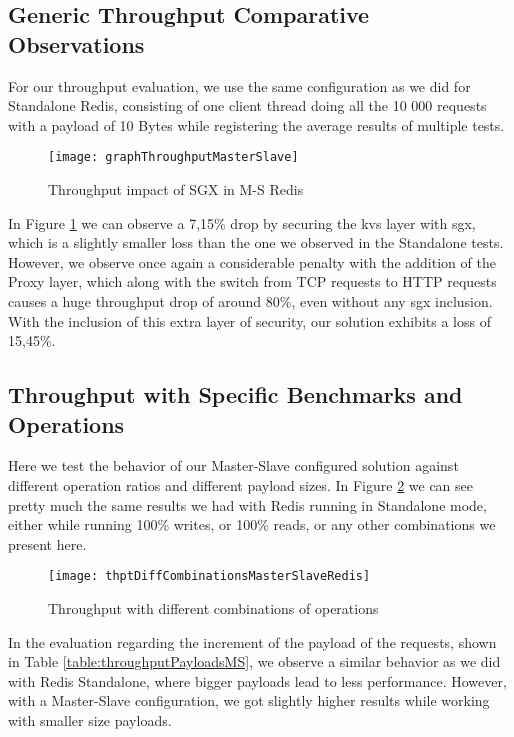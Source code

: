 \subsection{Generic Throughput Comparative Observations}
For our throughput evaluation, we use the same configuration as we did for Standalone Redis, consisting of one client thread doing all the 10 000 requests with a payload of 10 Bytes while registering the average results of multiple tests.

\begin{figure}[htbp]
	\centering
	{\texttt{[image: graphThroughputMasterSlave]}}
	\caption{Throughput impact of SGX in M-S Redis}
	\label{fig:graphTroughputMasterSlave}
\end{figure}

In Figure \ref{fig:graphTroughputMasterSlave} we can observe a 7,15\% drop by securing the \gls{kvs} layer with \gls{sgx}, which is a slightly smaller loss than the one we observed in the Standalone tests. However, we observe once again a considerable penalty with the addition of the Proxy layer, which along with the switch from TCP requests to HTTP requests causes a huge throughput drop of around 80\%, even without any \gls{sgx} inclusion. With the inclusion of this extra layer of security, our solution exhibits a loss of 15,45\%.



\subsection{Throughput with Specific Benchmarks and Operations}

Here we test the behavior of our Master-Slave configured solution against different operation ratios and different payload sizes. 
In Figure \ref{fig:thptDiffCombinationsMasterSlaveRedis} we can see pretty much the same results we had with Redis running in Standalone mode, either while running 100\% writes, or 100\% reads, or any other combinations we present here.  

\begin{figure}[htbp]
	\centering
	{\texttt{[image: thptDiffCombinationsMasterSlaveRedis]}}
	\caption{Throughput with different combinations of operations}
	\label{fig:thptDiffCombinationsMasterSlaveRedis}
\end{figure}

In the evaluation regarding the increment of the payload of the requests, shown in Table \ref{table:throughputPayloadsMS}, we observe a similar behavior as we did with Redis Standalone, where bigger payloads lead to less performance. However, with a Master-Slave configuration, we got slightly higher results while working with smaller size payloads.

